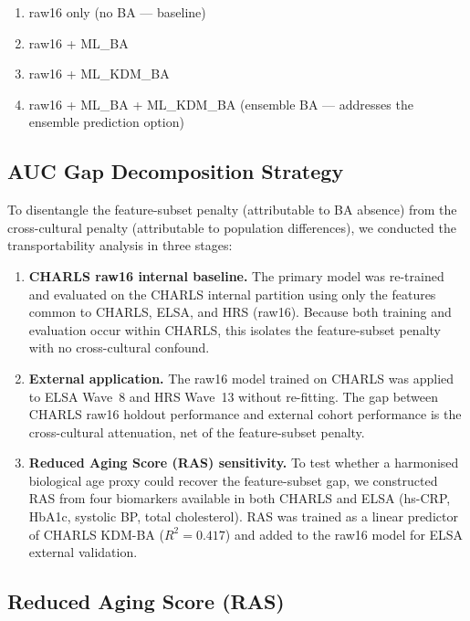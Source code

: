 \documentclass[11pt,a4paper]{article}
\begin{document}
\begin{enumerate}
  \item raw16 only (no BA --- baseline)
  \item raw16 + ML\_BA
  \item raw16 + ML\_KDM\_BA
  \item raw16 + ML\_BA + ML\_KDM\_BA (ensemble BA --- addresses the ensemble prediction option)
\end{enumerate}

\subsection{AUC Gap Decomposition Strategy}
\label{sec:auc-decomp}

To disentangle the feature-subset penalty (attributable to BA absence) from the cross-cultural
penalty (attributable to population differences), we conducted the transportability analysis in
three stages:

\begin{enumerate}
  \item \textbf{CHARLS raw16 internal baseline.} The primary model was re-trained and
        evaluated on the CHARLS internal partition using only the features common to
        CHARLS, ELSA, and HRS (raw16). Because both training and evaluation occur within
        CHARLS, this isolates the feature-subset penalty with no cross-cultural confound.
  \item \textbf{External application.} The raw16 model trained on CHARLS was applied to
        ELSA Wave~8 and HRS Wave~13 without re-fitting. The gap between CHARLS raw16
        holdout performance and external cohort performance is the cross-cultural
        attenuation, net of the feature-subset penalty.
  \item \textbf{Reduced Aging Score (RAS) sensitivity.} To test whether a harmonised
        biological age proxy could recover the feature-subset gap, we constructed RAS
        from four biomarkers available in both CHARLS and ELSA (hs-CRP, HbA1c, systolic
        BP, total cholesterol). RAS was trained as a linear predictor of CHARLS KDM-BA
        ($R^2=0.417$) and added to the raw16 model for ELSA external validation.
\end{enumerate}

\subsection{Reduced Aging Score (RAS)}
\label{sec:ras}
\end{document}
